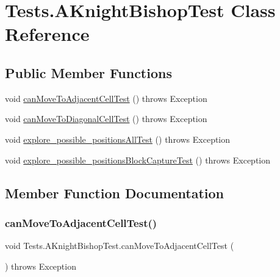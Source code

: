 \hypertarget{class_tests_1_1_a_knight_bishop_test}{}\section{Tests.\+A\+Knight\+Bishop\+Test Class Reference}
\label{class_tests_1_1_a_knight_bishop_test}
\subsection*{Public Member Functions}
\begin{DoxyCompactItemize}
\item 
void \hyperlink{class_tests_1_1_a_knight_bishop_test_a3804ee93d28784f6c05de9de3d471f23}{can\+Move\+To\+Adjacent\+Cell\+Test} ()  throws Exception 
\item 
void \hyperlink{class_tests_1_1_a_knight_bishop_test_a9e2fdb709b6ade91bf1799f1df5ef3da}{can\+Move\+To\+Diagonal\+Cell\+Test} ()  throws Exception 
\item 
void \hyperlink{class_tests_1_1_a_knight_bishop_test_ad7f78f2a16180ec51850bb052971c903}{explore\+\_\+possible\+\_\+positions\+All\+Test} ()  throws Exception 
\item 
void \hyperlink{class_tests_1_1_a_knight_bishop_test_af78327139c271d70d6ff8f2047b24444}{explore\+\_\+possible\+\_\+positions\+Block\+Capture\+Test} ()  throws Exception 
\end{DoxyCompactItemize}


\subsection{Member Function Documentation}
\mbox{\label{class_tests_1_1_a_knight_bishop_test_a3804ee93d28784f6c05de9de3d471f23}} 
\subsubsection{\texorpdfstring{can\+Move\+To\+Adjacent\+Cell\+Test()}{canMoveToAdjacentCellTest()}}
{\footnotesize\ttfamily void Tests.\+A\+Knight\+Bishop\+Test.\+can\+Move\+To\+Adjacent\+Cell\+Test (\begin{DoxyParamCaption}{ }\end{DoxyParamCaption}) throws Exception\hspace{0.3cm}{\ttfamily [inline]}}

